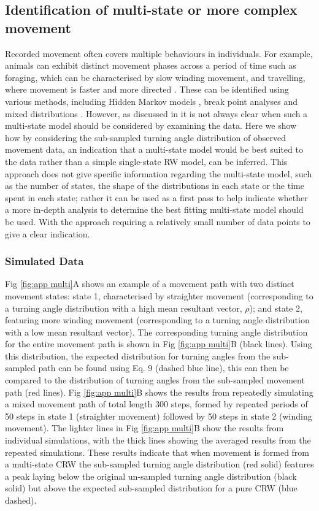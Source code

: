 \documentclass[english]{article}
\begin{document}
\subsection{Identification of multi-state or more complex movement}
Recorded movement often covers multiple behaviours in individuals.  For example, animals can exhibit distinct movement phases across a period of time such as foraging, which can be characterised by slow winding movement, and travelling, where movement is faster and more directed \citep{gurarie2016animal}.  These can be identified using various methods, including Hidden Markov models \citep{michelot2016movehmm}, break point analyses \citep{edelhoff2016path} and mixed distributions \citep{bailey2021emergence}.  However, as discussed in \citet{bailey2021emergence} it is not always clear when such a multi-state model should be considered by examining the data.  Here we show how by considering the sub-sampled turning angle distribution of observed movement data, an indication that a multi-state model would be best suited to the data rather than a simple single-state RW model, can be inferred.  This approach does not give specific information regarding the multi-state model, such as the number of states, the shape of the distributions in each state or the time spent in each state; rather it can be used as a first pass to help indicate whether a more in-depth analysis to determine the best fitting multi-state model should be used.  With the approach requiring a relatively small number of data points to give a clear indication.

\subsubsection{Simulated Data}
Fig \ref{fig:app multi}A shows an example of a movement path with two distinct movement states: state 1, characterised by straighter movement (corresponding to a turning angle distribution with a high mean resultant vector, $\rho$); and state 2, featuring more winding movement (corresponding to a turning angle distribution with a low mean resultant vector).  The corresponding turning angle distribution for the entire movement path is shown in Fig \ref{fig:app multi}B (black lines).  Using this distribution, the expected distribution for turning angles from the sub-sampled path can be found using Eq. 9 (dashed blue line), this can then be compared to the distribution of turning angles from the sub-sampled movement path (red lines).  Fig \ref{fig:app multi}B shows the results from repeatedly simulating a mixed movement path of total length 300 steps, formed by repeated periods of 50 steps in state 1 (straighter movement) followed by 50 steps in state 2 (winding movement).  The lighter lines in Fig \ref{fig:app multi}B show the results from individual simulations, with the thick lines showing the averaged results from the repeated simulations.  These results indicate that when movement is formed from a multi-state CRW the sub-sampled turning angle distribution (red solid) features a peak laying below the original un-sampled turning angle distribution (black solid) but above the expected sub-sampled distribution for a pure CRW (blue dashed).
\end{document}
